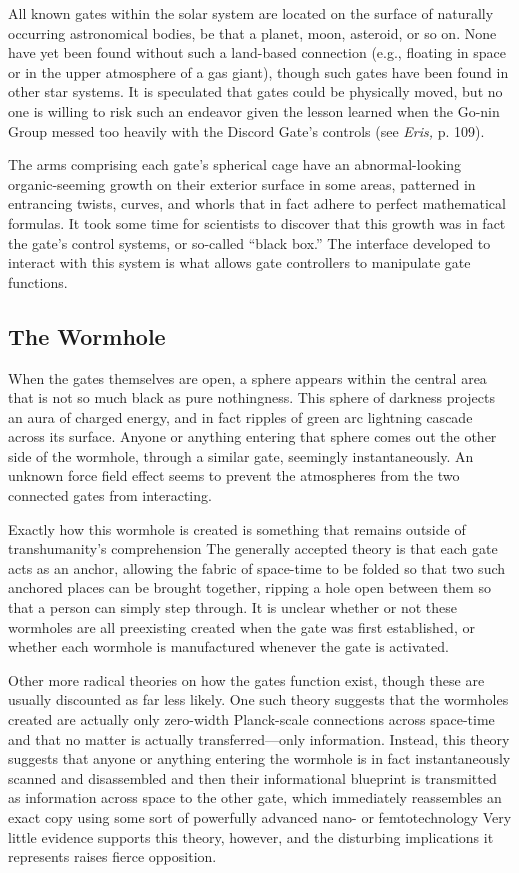 All known gates within the solar system are located 
on the surface of naturally occurring astronomical 
bodies, be that a planet, moon, asteroid, or so on. 
None have yet been found without such a land-based 
connection (e.g., floating in space or in the upper 
atmosphere of a gas giant), though such gates have 
been found in other star systems. It is speculated that 
gates could be physically moved, but no one is willing
to risk such an endeavor given the lesson learned
when the Go-nin Group messed too heavily with the 
Discord Gate's controls (see \textit{Eris, }p. 109).

The arms comprising each gate's spherical cage have 
an abnormal-looking organic-seeming growth on their 
exterior surface in some areas, patterned in entrancing
twists, curves, and whorls that in fact adhere to
perfect mathematical formulas. It took some time for 
scientists to discover that this growth was in fact the 
gate's control systems, or so-called ``black box.'' The 
interface developed to interact with this system is what 
allows gate controllers to manipulate gate functions.

\subsection{The Wormhole}

When the gates themselves are open, a sphere appears 
within the central area that is not so much black as 
pure nothingness. This sphere of darkness projects an 
aura of charged energy, and in fact ripples of green 
arc lightning cascade across its surface. Anyone or 
anything entering that sphere comes out the other side 
of the wormhole, through a similar gate, seemingly 
instantaneously. An unknown force field effect seems 
to prevent the atmospheres from the two connected 
gates from interacting.

Exactly how this wormhole is created is something 
that remains outside of transhumanity's comprehension
The generally accepted theory is that each gate
acts as an anchor, allowing the fabric of space-time 
to be folded so that two such anchored places can 
be brought together, ripping a hole open between 
them so that a person can simply step through. It is 
unclear whether or not these wormholes are all preexisting
created when the gate was first established,
or whether each wormhole is manufactured whenever 
the gate is activated.

Other more radical theories on how the gates function
exist, though these are usually discounted as far
less likely. One such theory suggests that the wormholes
created are actually only zero-width Planck-scale
connections across space-time and that no matter
is actually transferred—only information. Instead, this 
theory suggests that anyone or anything entering the 
wormhole is in fact instantaneously scanned and disassembled
and then their informational blueprint is
transmitted as information across space to the other 
gate, which immediately reassembles an exact copy 
using some sort of powerfully advanced nano- or femtotechnology
Very little evidence supports this theory,
however, and the disturbing implications it represents 
raises fierce opposition.

